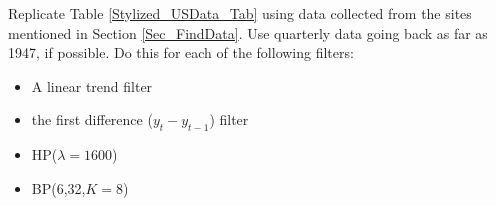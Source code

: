 \documentclass[letterpaper,11pt]{article}
\theoremstyle{definition}
\begin{document}
\begin{spacing}{1.5}
    \begin{Exercise} \label{Filter_HW_Moments}
        Replicate Table \ref{Stylized_USData_Tab} using data collected from the sites mentioned in Section \ref{Sec_FindData}.  Use quarterly data going back as far as 1947, if possible.  Do this for each of the following filters:
        \begin{itemize}
          \setlength\itemsep{0em}
          \item A linear trend filter
          \item the first difference ($y_t - y_{t-1}$) filter
          \item HP($\lambda=1600$)
          \item BP(6,32,$K=8$)
        \end{itemize}
    \end{Exercise}

\end{spacing}
\end{document}
